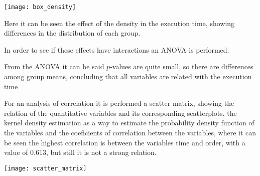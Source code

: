 \documentclass[10pt,a4paper,openany]{article}
\begin{document}
	\begin{center}
	\texttt{[image: box\_density]}
	\end{center}	
	
	Here it can be seen the effect of the density in the execution time, showing differences in the distribution of each group.
	
	\vspace*{0,2 cm}
	In order to see if these effects have interactions an ANOVA is performed.
	
	From the ANOVA it can be said $ p $-values are quite small, so there are differences among group means, concluding that all variables are related with the execution time
	
	For an analysis of correlation it is performed a scatter matrix, showing the relation of the quantitative variables and its corresponding scatterplots, the kernel density estimation as a way to estimate the probability density function of the variables and the coeficients of correlation between the variables, where it can be seen the highest correlation is between the variables time and order, with a value of 0.613, but still it is not a strong relation.
	
	\begin{center}
		\texttt{[image: scatter\_matrix]}
	\end{center}
	
	
	
	
\end{document}

